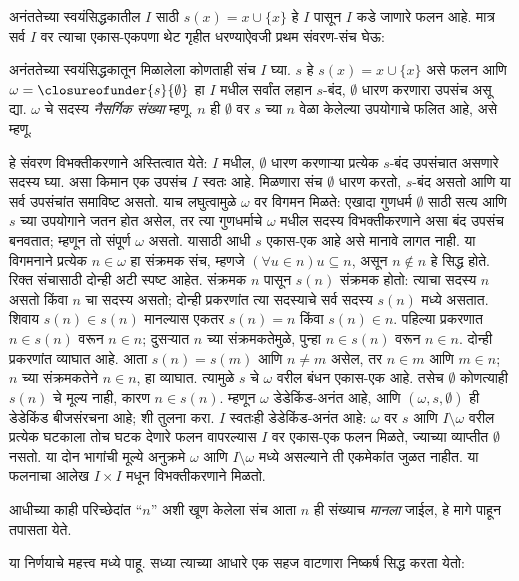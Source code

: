 \documentclass[../../../include/open-logic-section]{subfiles}
\begin{document}
अनंततेच्या स्वयंसिद्धकातील $I$ साठी $s(x)=x\cup\{x\}$ हे
$I$ पासून $I$ कडे जाणारे फलन आहे. मात्र सर्व $I$ वर त्याचा
एकास-एकपणा थेट गृहीत धरण्याऐवजी प्रथम संवरण-संच घेऊ:
\begin{defn}
अनंततेच्या स्वयंसिद्धकातून मिळालेला कोणताही संच $I$ घ्या.
$s$ हे $s(x)=x\cup\{x\}$ असे फलन आणि
$\omega=\closureofunder{s}{\emptyset}$ हा $I$ मधील सर्वांत लहान
$s$-बंद, $\emptyset$ धारण करणारा उपसंच असू द्या.
$\omega$ चे सदस्य \emph{नैसर्गिक संख्या} म्हणू.
$n$ ही $\emptyset$ वर $s$ च्या $n$ वेळा केलेल्या उपयोगाचे फलित आहे,
असे म्हणू.
\end{defn}
हे संवरण विभक्तीकरणाने अस्तित्वात येते: $I$ मधील,
$\emptyset$ धारण करणाऱ्या प्रत्येक $s$-बंद उपसंचात असणारे सदस्य घ्या.
असा किमान एक उपसंच $I$ स्वतः आहे. मिळणारा संच
$\emptyset$ धारण करतो, $s$-बंद असतो आणि या सर्व उपसंचांत समाविष्ट असतो.
याच लघुत्वामुळे $\omega$ वर विगमन मिळते: एखादा गुणधर्म
$\emptyset$ साठी सत्य आणि $s$ च्या उपयोगाने जतन होत असेल,
तर त्या गुणधर्माचे $\omega$ मधील सदस्य विभक्तीकरणाने
असा बंद उपसंच बनवतात; म्हणून तो संपूर्ण $\omega$ असतो.
यासाठी आधी $s$ एकास-एक आहे असे मानावे लागत नाही.
या विगमनाने प्रत्येक $n\in\omega$ हा संक्रमक संच,
म्हणजे $(\forall u\in n)u\subseteq n$, असून $n\notin n$ हे सिद्ध होते.
रिक्त संचासाठी दोन्ही अटी स्पष्ट आहेत.
संक्रमक $n$ पासून $s(n)$ संक्रमक होतो: त्याचा सदस्य
$n$ असतो किंवा $n$ चा सदस्य असतो; दोन्ही प्रकरणांत
त्या सदस्याचे सर्व सदस्य $s(n)$ मध्ये असतात.
शिवाय $s(n)\in s(n)$ मानल्यास एकतर $s(n)=n$ किंवा $s(n)\in n$.
पहिल्या प्रकरणात $n\in s(n)$ वरून $n\in n$;
दुसऱ्यात $n$ च्या संक्रमकतेमुळे, पुन्हा $n\in s(n)$ वरून $n\in n$.
दोन्ही प्रकरणांत व्याघात आहे.
आता $s(n)=s(m)$ आणि $n\neq m$ असेल, तर
$n\in m$ आणि $m\in n$; $n$ च्या संक्रमकतेने $n\in n$,
हा व्याघात. त्यामुळे $s$ चे $\omega$ वरील बंधन एकास-एक आहे.
तसेच $\emptyset$ कोणत्याही $s(n)$ चे मूल्य नाही,
कारण $n\in s(n)$. म्हणून $\omega$ डेडेकिंड-अनंत आहे,
आणि $(\omega,s,\emptyset)$ ही डेडेकिंड बीजसंरचना आहे;
शी तुलना करा. $I$ स्वतःही डेडेकिंड-अनंत आहे:
$\omega$ वर $s$ आणि $I\setminus\omega$ वरील प्रत्येक घटकाला तोच घटक देणारे फलन वापरल्यास
$I$ वर एकास-एक फलन मिळते, ज्याच्या व्याप्तीत $\emptyset$ नसतो. या दोन भागांची मूल्ये अनुक्रमे $\omega$ आणि
$I\setminus\omega$ मध्ये असल्याने ती एकमेकांत जुळत नाहीत.
या फलनाचा आलेख $I\times I$ मधून विभक्तीकरणाने मिळतो.

आधीच्या काही परिच्छेदांत ``$n$'' अशी खूण केलेला संच आता $n$ ही संख्याच \emph{मानला} जाईल, हे मागे पाहून तपासता येते.

या निर्णयाचे महत्त्व  मध्ये पाहू. सध्या त्याच्या आधारे एक सहज वाटणारा निष्कर्ष सिद्ध करता येतो:
\end{document}
